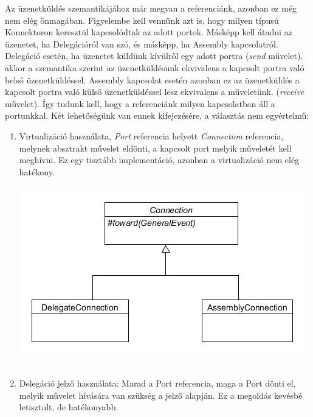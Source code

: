 \documentclass[a4paper,12pt]{report}
\begin{document}
Az üzenetküldés szemantikájához már megvan a referenciánk, azonban ez még nem elég önmagában. Figyelembe kell vennünk azt is, hogy milyen típusú Konnektoron keresztül kapcsolódtak az adott portok. Másképp kell átadni az üzenetet, ha Delegációról van szó, és másképp, ha Assembly kapcsolatról. Delegáció esetén, ha üzenetet küldünk kívülről egy adott portra (\textit{send} művelet), akkor a szemantika szerint az üzenetküldésünk ekvivalens a kapcsolt portra való belső üzenetküldéssel. Assembly kapcsolat esetén azonban ez az üzenetküldés a kapcsolt portra való külső üzenetküldéssel lesz ekvivalens a műveletünk. (\textit{receive} művelet). Így tudunk kell, hogy a referenciánk milyen kapcsolatban áll a portunkkal. Két lehetőségünk van ennek kifejezésére, a választás nem egyértelmű:
\begin{enumerate}
\item Virtualizáció használata, \textit{Port} referencia helyett \textit{Connection} referencia, melynek absztrakt művelet eldönti, a kapcsolt port melyik műveletét kell meghívni. Ez egy tisztább implementáció, azonban a virtualizáció nem elég hatékony. \\\\
\includegraphics[scale=0.7]{connection.png} \\ \\
\item Delegáció jelző használata: Marad a Port referencia, maga a Port dönti el, melyik művelet hívására van szükség a jelző alapján. Ez a megoldás kevésbé letisztult, de hatékonyabb. \\

\end{enumerate}
\end{document}
